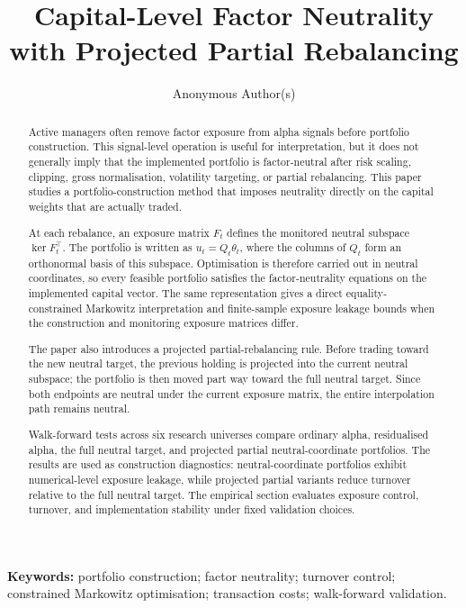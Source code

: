 \documentclass[11pt]{article}
\title{Capital-Level Factor Neutrality with Projected Partial Rebalancing}
\author{Anonymous Author(s)}
\date{}
\begin{document}
\maketitle

\begin{abstract}
Active managers often remove factor exposure from alpha signals before portfolio construction.  This
signal-level operation is useful for interpretation, but it does not generally imply that the implemented
portfolio is factor-neutral after risk scaling, clipping, gross normalisation, volatility targeting, or partial
rebalancing.  This paper studies a portfolio-construction method that imposes neutrality directly on the
capital weights that are actually traded.

At each rebalance, an exposure matrix $F_t$ defines the monitored neutral subspace
$\ker F_t^\top$.  The portfolio is written as $u_t=Q_t\theta_t$, where the columns of $Q_t$ form an
orthonormal basis of this subspace.  Optimisation is therefore carried out in neutral coordinates, so every
feasible portfolio satisfies the factor-neutrality equations on the implemented capital vector.  The same
representation gives a direct equality-constrained Markowitz interpretation and finite-sample exposure
leakage bounds when the construction and monitoring exposure matrices differ.

The paper also introduces a projected partial-rebalancing rule.  Before trading toward the new neutral
target, the previous holding is projected into the current neutral subspace; the portfolio is then moved
part way toward the full neutral target.  Since both endpoints are neutral under the current exposure
matrix, the entire interpolation path remains neutral.

Walk-forward tests across six research universes compare ordinary alpha, residualised alpha, the full
neutral target, and projected partial neutral-coordinate portfolios.  The results are used as construction
diagnostics: neutral-coordinate portfolios exhibit numerical-level exposure leakage, while projected
partial variants reduce turnover relative to the full neutral target.  The empirical section evaluates
exposure control, turnover, and implementation stability under fixed validation choices.
\end{abstract}

\noindent\textbf{Keywords:} portfolio construction; factor neutrality; turnover control;
constrained Markowitz optimisation; transaction costs; walk-forward validation.
\end{document}
